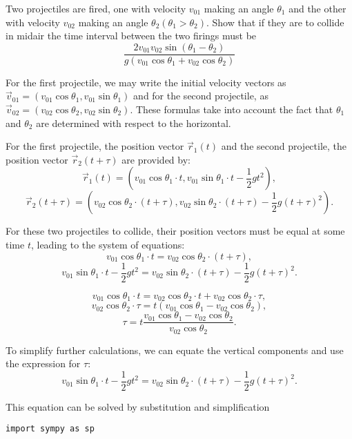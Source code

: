 \begin{problem}{6.55}
Two projectiles are fired, one with velocity \(v_{01}\) making an angle \(\theta_1\) and the other with velocity \(v_{02}\) making an angle \(\theta_2\left(\theta_1>\theta_2\right)\). Show that if they are to collide in midair the time interval between the two firings must be
\[
\frac{2 v_{01} v_{02} \sin \left(\theta_1-\theta_2\right)}{g\left(v_{01} \cos \theta_1+v_{02} \cos \theta_2\right)}
\]
\end{problem}

\begin{solution}{6.55}
For the first projectile, we may write the initial velocity vectors as \(\vec{v}_{01} = (v_{01} \cos \theta_1, v_{01} \sin \theta_1)\) and for the second projectile, as \(\vec{v}_{02} = (v_{02} \cos \theta_2, v_{02} \sin \theta_2)\). These formulas take into account the fact that \(\theta_1\) and \(\theta_2\) are determined with respect to the horizontal.

For the first projectile, the position vector \(\vec{r}_1(t)\) and the second projectile, the position vector \(\vec{r}_2(t+\tau)\) are provided by:
\[
\vec{r}_1(t) = \left(v_{01} \cos \theta_1 \cdot t, v_{01} \sin \theta_1 \cdot t - \frac{1}{2} g t^2\right),
\]
\[
\vec{r}_2(t+\tau) = \left(v_{02} \cos \theta_2 \cdot (t + \tau), v_{02} \sin \theta_2 \cdot (t + \tau) - \frac{1}{2} g (t + \tau)^2\right).
\]

For these two projectiles to collide, their position vectors must be equal at some time \(t\), leading to the system of equations:
\[
v_{01} \cos \theta_1 \cdot t = v_{02} \cos \theta_2 \cdot (t + \tau),
\]
\[
v_{01} \sin \theta_1 \cdot t - \frac{1}{2} g t^2 = v_{02} \sin \theta_2 \cdot (t + \tau) - \frac{1}{2} g (t + \tau)^2.
\]

\[
v_{01} \cos \theta_1 \cdot t = v_{02} \cos \theta_2 \cdot t + v_{02} \cos \theta_2 \cdot \tau,
\]
\[
v_{02} \cos \theta_2 \cdot \tau = t (v_{01} \cos \theta_1 - v_{02} \cos \theta_2),
\]
\[
\tau = t \frac{v_{01} \cos \theta_1 - v_{02} \cos \theta_2}{v_{02} \cos \theta_2}.
\]

To simplify further calculations, we can equate the vertical components and use the expression for \(\tau\):
\[
v_{01} \sin \theta_1 \cdot t - \frac{1}{2} g t^2 = v_{02} \sin \theta_2 \cdot (t + \tau) - \frac{1}{2} g (t + \tau)^2.
\]

This equation can be solved by substitution and simplification
\begin{lstlisting}[language=iPython]
import sympy as sp


\end{lstlisting}
\end{solution}
